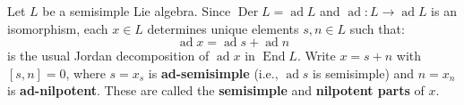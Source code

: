 Let $L$ be a semisimple Lie algebra. Since $\operatorname{Der} L = \operatorname{ad} L$ and $\operatorname{ad}: L \to \operatorname{ad} L$ is an isomorphism, each $x \in L$ determines unique elements $s, n \in L$ such that:
$$\operatorname{ad} x = \operatorname{ad} s + \operatorname{ad} n$$
is the usual Jordan decomposition of $\operatorname{ad} x$ in $\operatorname{End} L$. Write $x = s + n$ with $[s, n] = 0$, where $s = x_s$ is \textbf{ad-semisimple} (i.e., $\operatorname{ad} s$ is semisimple) and $n = x_n$ is \textbf{ad-nilpotent}. These are called the \textbf{semisimple} and \textbf{nilpotent parts} of $x$.
